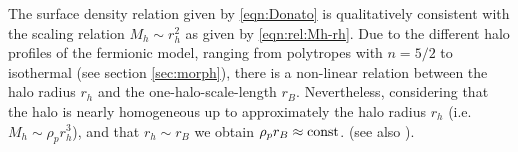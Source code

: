 The surface density relation given by \cref{eqn:Donato} is qualitatively consistent with the scaling relation $M_h \sim r_h^2$ as given by \cref{eqn:rel:Mh-rh}. Due to the different halo profiles of the fermionic model, ranging from polytropes with $n=5/2$ to isothermal (see section \ref{sec:morph}), there is a non-linear relation between the halo radius $r_h$ and the one-halo-scale-length $r_B$. Nevertheless, considering that the halo is nearly homogeneous up to approximately the halo radius $r_h$ (i.e. $M_h \sim \rho_p r_h^3$), and that $r_h \sim r_B$ we obtain $\rho_p r_B \approx \mathrm{const}$. (see also \citealp{2019PDU....24..278A}).

